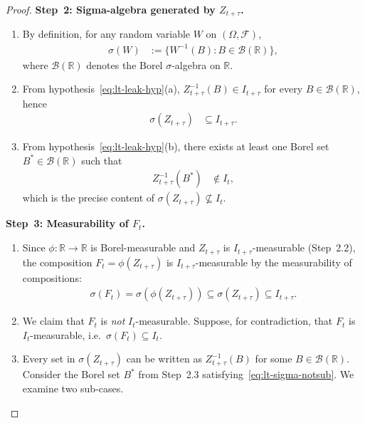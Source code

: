 \documentclass[12pt,openany]{book}
\newcommand{\calF}{\mathcal{F}}
\newcommand{\calI}{\mathcal{I}}
\numberwithin{equation}{chapter}
\theoremstyle{plain}
\theoremstyle{definition}
\theoremstyle{remark}
\numberwithin{equation}{chapter}
\theoremstyle{plain}
\def\calI{I}%
\begin{document}
\begin{proof}
\medskip
\noindent\textbf{Step~2: Sigma-algebra generated by $Z_{t+\tau}$.}
\begin{enumerate}
  \item By definition, for any random variable $W$ on
        $(\Omega,\calF)$,
        \begin{align}
          \sigma(W) &:= \{W^{-1}(B) : B \in \mathcal{B}(\mathbb{R})\},
          \label{eq:lt-sigma-def}
        \end{align}
        where $\mathcal{B}(\mathbb{R})$ denotes the Borel
        $\sigma$-algebra on $\mathbb{R}$.
  \item From hypothesis~\eqref{eq:lt-leak-hyp}(a),
        $Z_{t+\tau}^{-1}(B) \in \calI_{t+\tau}$ for every
        $B \in \mathcal{B}(\mathbb{R})$, hence
        \begin{align}
          \sigma(Z_{t+\tau}) &\subseteq \calI_{t+\tau}.
          \label{eq:lt-sigma-sub}
        \end{align}
  \item From hypothesis~\eqref{eq:lt-leak-hyp}(b), there exists
        at least one Borel set $B^* \in \mathcal{B}(\mathbb{R})$
        such that
        \begin{align}
          Z_{t+\tau}^{-1}(B^*) &\notin \calI_t,
          \label{eq:lt-sigma-notsub}
        \end{align}
        which is the precise content of
        $\sigma(Z_{t+\tau}) \not\subseteq \calI_t$.
\end{enumerate}

\medskip
\noindent\textbf{Step~3: Measurability of $F_t$.}
\begin{enumerate}
  \item Since $\phi : \mathbb{R} \to \mathbb{R}$ is
        Borel-measurable and $Z_{t+\tau}$ is
        $\calI_{t+\tau}$-measurable (Step~2.2), the composition
        $F_t = \phi(Z_{t+\tau})$ is $\calI_{t+\tau}$-measurable
        by the measurability of compositions:
        \begin{align}
          \sigma(F_t)
            = \sigma\!\left(\phi(Z_{t+\tau})\right)
            \subseteq \sigma(Z_{t+\tau})
            \subseteq \calI_{t+\tau}.
          \label{eq:lt-Ft-sub}
        \end{align}
  \item We claim that $F_t$ is \emph{not} $\calI_t$-measurable.
        Suppose, for contradiction, that $F_t$ is
        $\calI_t$-measurable, i.e.\
        $\sigma(F_t) \subseteq \calI_t$.
  \item Every set in $\sigma(Z_{t+\tau})$ can be written as
        $Z_{t+\tau}^{-1}(B)$ for some $B \in \mathcal{B}(\mathbb{R})$.
        Consider the Borel set $B^*$ from
        Step~2.3 satisfying~\eqref{eq:lt-sigma-notsub}.  We
        examine two sub-cases.


\end{enumerate}
\end{proof}
\end{document}
